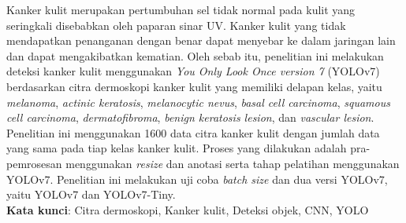 \documentclass[]{mathuinsa}
\begin{document}
    \newpage{}
    \begin{onehalfspacing}\listoftables\end{onehalfspacing}


    \newpage{}
    \begin{onehalfspacing}\listoffigures\end{onehalfspacing}


    \begin{abstractind}
        Kanker kulit merupakan pertumbuhan sel tidak normal pada kulit yang seringkali disebabkan oleh paparan sinar UV. Kanker kulit yang tidak mendapatkan penanganan dengan benar dapat menyebar ke dalam jaringan lain dan dapat mengakibatkan kematian. Oleh sebab itu, penelitian ini melakukan deteksi kanker kulit menggunakan \textit{You Only Look Once version 7} (YOLOv7) berdasarkan citra dermoskopi kanker kulit yang memiliki delapan kelas, yaitu \textit{melanoma}, \textit{actinic keratosis}, \textit{melanocytic nevus}, \textit{basal cell carcinoma}, \textit{squamous cell carcinoma}, \textit{dermatofibroma}, \textit{benign keratosis lesion}, dan \textit{vascular lesion}. Penelitian ini menggunakan 1600 data citra kanker kulit dengan jumlah data yang sama pada tiap kelas kanker kulit. Proses yang dilakukan adalah pra-pemrosesan menggunakan \textit{resize} dan anotasi serta tahap pelatihan menggunakan YOLOv7. Penelitian ini melakukan uji coba \textit{batch size} dan dua versi YOLOv7, yaitu YOLOv7 dan YOLOv7-Tiny.\\
        \noindent
        \textbf{Kata kunci}: Citra dermoskopi, Kanker kulit, Deteksi objek, CNN, YOLO
    \end{abstractind}
    
\end{document}
